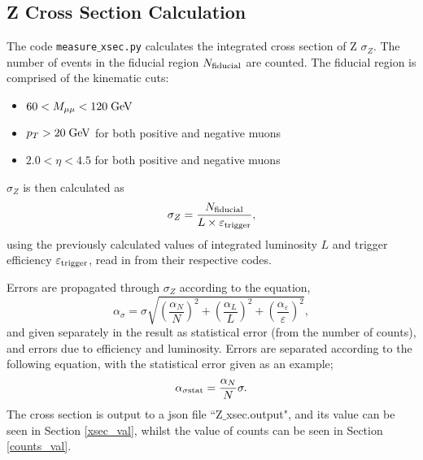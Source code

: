 \documentclass[a4paper]{article}
\begin{document}
\subsection{Z Cross Section Calculation} \label{sec: Z xsec}
The code \texttt{measure$\_$xsec.py} calculates the integrated cross section of Z $\sigma_Z$.
The number of events in the fiducial region $N_{\rm fiducial}$ are counted. The fiducial region is comprised of the kinematic cuts:

\begin{itemize}
  \item $60 < M_{\mu\mu} < 120 \; {\rm GeV}$ 
  \item $p_T > 20 \; {\rm GeV}$ for both positive and negative muons
  \item $2.0 < \eta < 4.5$ for both positive and negative muons
\end{itemize}

$\sigma_Z$ is then calculated as
\begin{equation}
\sigma_Z = \frac{N_{\rm fiducial}}{L \times {\varepsilon_{\rm trigger}}},
\label{eq: Z_xsec}
\end{equation}
using the previously calculated values of integrated luminosity $L$ and trigger efficiency $\varepsilon_{\rm trigger}$, read in from their respective codes.

Errors are propagated through $\sigma_Z$ according to the equation,
\begin{equation}
    \alpha_\sigma = \sigma \sqrt{\left(\frac{\alpha_N}{N}\right)^2 + \left(\frac{\alpha_L}{L}\right)^2 + \left(\frac{\alpha_\varepsilon}{\varepsilon}\right)^2},
    \label{eq: xsec error}
\end{equation}
and given separately in the result as statistical error (from the number of counts), and errors due to efficiency and luminosity. Errors are separated according to the following equation, with the statistical error given as an example;
\begin{equation}
    \alpha_{\sigma {\rm stat}} = \frac{\alpha_N}{N}\sigma.
    \label{eq: xsec error separation}
\end{equation}
The cross section is output to a json file ``Z$\_$xsec.output", and its value can be seen in Section \ref{xsec_val}, whilst the value of counts can be seen in Section \ref{counts_val}.
\end{document}
